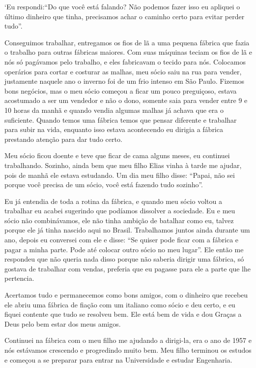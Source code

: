 `Eu respondi:``Do que você está falando? Não podemos fazer isso eu
apliquei o último dinheiro que tinha, precisamos achar o caminho certo
para evitar perder tudo''.

Conseguimos trabalhar, entregamos os fios de lã a uma pequena fábrica
que fazia o trabalho para outras fábricas maiores. Com suas máquinas
teciam os fios de lã e nós só pagávamos pelo trabalho, e eles fabricavam
o tecido para nós. Colocamos operários para cortar e costurar as malhas,
meu sócio saiu na rua para vender, justamente naquele ano o inverno foi
de um frio intenso em São Paulo. Fizemos bons negócios, mas o meu sócio
começou a ficar um pouco preguiçoso, estava acostumado a ser um vendedor
e não o dono, somente saia para vender entre 9 e 10 horas da manhã e
quando vendia algumas malhas já achava que era o suficiente. Quando
temos uma fábrica temos que pensar diferente e trabalhar para subir na
vida, enquanto isso estava acontecendo eu dirigia a fábrica prestando
atenção para dar tudo certo.

Meu sócio ficou doente e teve que ficar de cama alguns meses, eu
continuei trabalhando. Sozinho, ainda bem que meu filho Elias vinha à
tarde me ajudar, pois de manhã ele estava estudando. Um dia meu filho
disse: ``Papai, não sei porque você precisa de um sócio, você está
fazendo tudo sozinho''.

Eu já entendia de toda a rotina da fábrica, e quando meu sócio voltou a
trabalhar eu acabei sugerindo que podíamos dissolver a sociedade. Eu e
meu sócio não combinávamos, ele não tinha ambição de batalhar como eu,
talvez porque ele já tinha nascido aqui no Brasil. Trabalhamos juntos
ainda durante um ano, depois eu conversei com ele e disse: ``Se quiser
pode ficar com a fábrica e pagar a minha parte. Pode até colocar outro
sócio no meu lugar''. Ele então me respondeu que não queria nada disso
porque não saberia dirigir uma fábrica, só gostava de trabalhar com
vendas, preferia que eu pagasse para ele a parte que lhe pertencia.

Acertamos tudo e permanecemos como bons amigos, com o dinheiro que
recebeu ele abriu uma fábrica de fiação com um italiano como sócio e deu
certo, e eu fiquei contente que tudo se resolveu bem. Ele está bem de
vida e dou Graças a Deus pelo bem estar dos meus amigos.

Continuei na fábrica com o meu filho me ajudando a dirigi-la, era o ano
de 1957 e nós estávamos crescendo e progredindo muito bem. Meu filho
terminou os estudos e começou a se preparar para entrar na Universidade
e estudar Engenharia.


